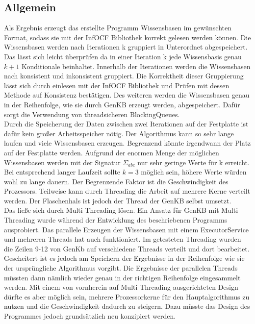 \documentclass[12pt,a4paper]{article}
\begin{document}
\subsection{Allgemein}
Als Ergebnis erzeugt das erstellte Programm Wissensbasen im gewünschten Format, sodass sie mit der InfOCF Bibliothek korrekt gelesen werden können. Die Wissensbasen werden nach Iterationen k gruppiert in Unterordnet abgespeichert. Das lässt sich leicht überprüfen da in einer Iteration k jede Wissensbasis genau $k+1$ Konditionale beinhaltet. Innerhalb der Iterationen werden die Wissensbasen nach konsistent und inkonsistent gruppiert. Die Korrektheit dieser Gruppierung lässt sich durch einlesen mit der InfOCF Bibliothek und Prüfen mit dessen Methode auf Konsistenz bestätigen. Des weiteren werden die Wissensbasen genau in der Reihenfolge, wie sie durch GenKB erzeugt werden, abgespeichert. Dafür sorgt die Verwendung von threadsicheren BlockingQueues. \\
Durch die Speicherung der Daten zwischen zwei Iterationen auf der Festplatte ist dafür kein großer Arbeitsspeicher nötig. Der Algorithmus kann so sehr lange laufen und viele Wissensbasen erzeugen. Begrenzend könnte irgendwann der Platz auf der Festplatte werden. Aufgrund der enormen Menge der möglichen Wissensbasen werden mit der Signatur $\Sigma_{abc}$ nur sehr geringe Werte für k erreicht. Bei entsprechend langer Laufzeit sollte $k=3$ möglich sein, höhere Werte würden wohl zu lange dauern. Der Begrenzende Faktor ist die Geschwindigkeit des Prozessors. Teilweise kann durch Threading die Arbeit auf mehrere Kerne verteilt werden. Der Flaschenhals ist jedoch der Thread der GenKB selbst umsetzt.\\
Das ließe sich durch Multi Threading lösen. Ein Ansatz für GenKB mit Multi Threading wurde während der Entwicklung des beschriebenen Programms ausprobiert. Das parallele Erzeugen der Wissensbasen mit einem ExecutorService und mehreren Threads hat auch funktioniert. Im getesteten Threading wurden die Zeilen 9-12 von GenKb auf verschiedene Threads verteilt und dort bearbeitet. Gescheitert ist es jedoch am Speichern der Ergebnisse in der Reihenfolge wie sie der ursprüngliche Algorithmus vorgibt. Die Ergebnisse der parallelen Threads müssten dann nämlich wieder genau in der richtigen Reihenfolge eingesammelt werden. Mit einem von vornherein auf Multi Threading ausgerichteten Design dürfte es aber möglich sein, mehrere Prozessorkerne für den Hauptalgorithmus zu nutzen und die Geschwindigkeit dadurch zu steigern. Dazu müsste das Design des Programmes jedoch grundsätzlich neu konzipiert werden.
\end{document}
